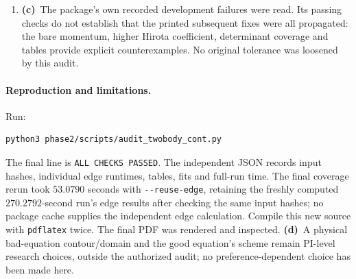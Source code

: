 \documentclass[11pt,a4paper]{article}
\newcommand{\Lc}{\textbf{(c)}\ }
\newcommand{\Ld}{\textbf{(d)}\ }
\newcommand{\file}[1]{\nolinkurl{#1}}
\begin{document}
\begin{enumerate}
changed a file, and the intended paragraph was subsequently inserted correctly.
A search containing unescaped regex braces also failed and was rerun as a
literal search; it had no numerical effect.
The first build with generated tables failed because Python interpreted
LaTeX backslashes as control characters in two headings. The headings were
repaired without changing any numerical cell.
An overbroad post-build log guard then matched the installed package's harmless
description ``Rerun checks for auxiliary files'', preventing the PDF copy and
therefore the next render. The guard now checks actual rerun-warning strings;
both LaTeX compilations themselves had succeeded.
\item \Lc The package's own recorded development failures were read. Its
passing checks do not establish that the printed subsequent fixes were all
propagated: the bare momentum, higher Hirota coefficient, determinant
coverage and tables provide explicit counterexamples. No original tolerance
was loosened by this audit.
\end{enumerate}

\paragraph{Reproduction and limitations.}
Run:
\begin{verbatim}
python3 phase2/scripts/audit_twobody_cont.py
\end{verbatim}
The final line is \texttt{ALL CHECKS PASSED}. The independent JSON records
input hashes, individual edge runtimes, tables, fits and full-run time.
The final coverage rerun took $53.0790$ seconds with
\file{--reuse-edge}, retaining the freshly computed $270.2792$-second run's
edge results after checking the same input hashes; no package cache supplies
the independent edge calculation.
Compile this new source with \file{pdflatex} twice. The final PDF was rendered
and inspected. \Ld A physical bad-equation contour/domain and the good
equation's scheme remain PI-level research choices, outside the authorized
audit; no preference-dependent choice has been made here.
\end{document}
